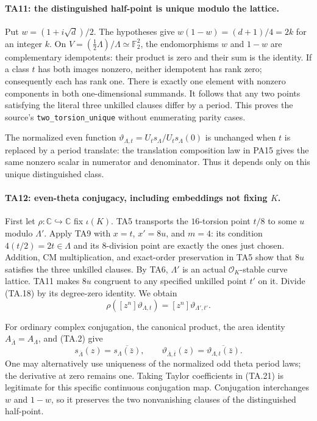 \paragraph{TA11: the distinguished half-point is unique modulo the lattice.}
Put $w=(1+i\sqrt d)/2$. The hypotheses give
$w(1-w)=(d+1)/4=2k$ for an integer $k$.
On $V=(\tfrac12\Lambda)/\Lambda\simeq\mathbb F_2^2$, the
endomorphisms $w$ and $1-w$ are complementary idempotents:
their product is zero and their sum is the identity.
If a class $t$ has both images nonzero, neither idempotent
has rank zero; consequently each has rank one. There is
exactly one element with nonzero components in both
one-dimensional summands. It follows that any two points
satisfying the literal three unkilled clauses differ by
a period. This proves the source's
\texttt{two\_torsion\_unique} without enumerating parity cases.

The normalized even function
$\vartheta_{\Lambda,t}=U_ts_\Lambda/U_ts_\Lambda(0)$ is unchanged
when $t$ is replaced by a period translate: the translation
composition law in PA15 gives the same nonzero scalar in
numerator and denominator. Thus it depends only on this
unique distinguished class.

\paragraph{TA12: even-theta conjugacy, including embeddings not fixing $K$.}
First let $\rho:\mathbb C\hookrightarrow\mathbb C$ fix
$\iota(K)$. TA5 transports the $16$-torsion point $t/8$
to some $u$ modulo $\Lambda'$. Apply TA9 with $x=t$,
$x'=8u$, and $m=4$: its condition $4(t/2)=2t\in\Lambda$
and its $8$-division point are exactly the ones just chosen.
Addition, CM multiplication, and exact-order preservation
in TA5 show that $8u$ satisfies the three unkilled clauses.
By TA6, $\Lambda'$ is an actual $\mathcal O_K$-stable curve
lattice. TA11 makes $8u$ congruent to any specified
unkilled point $t'$ on it. Divide (TA.18) by its degree-zero
identity. We obtain
\[
 \rho([z^n]\vartheta_{\Lambda,t})
                   =[z^n]\vartheta_{\Lambda',t'}.            \tag{TA.20}
\]

For ordinary complex conjugation, the canonical product,
the area identity $A_{\bar\Lambda}=A_\Lambda$, and (TA.2)
give
\[
 s_{\bar\Lambda}(z)=\overline{s_\Lambda(\bar z)},\qquad
 \vartheta_{\bar\Lambda,\bar t}(z)
                 =\overline{\vartheta_{\Lambda,t}(\bar z)}.   \tag{TA.21}
\]
One may alternatively use uniqueness of the normalized odd
theta period laws; the derivative at zero remains one.
Taking Taylor coefficients in (TA.21) is legitimate for
this specific continuous conjugation map. Conjugation
interchanges $w$ and $1-w$, so it preserves the two
nonvanishing clauses of the distinguished half-point.

